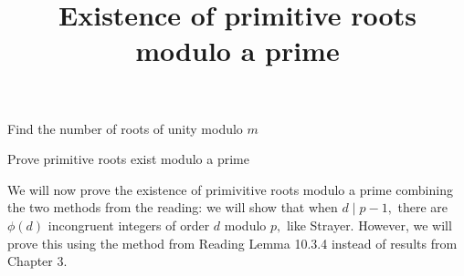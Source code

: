 \documentclass{ximera}
\title{Existence of primitive roots modulo a prime}
\begin{document}
\begin{abstract}
\end{abstract}
\maketitle


\begin{obj}
    \item Find the number of roots of unity modulo $m$
    \item Prove primitive roots exist modulo a prime
\end{obj}

We will now prove the existence of primivitive roots modulo a prime combining the two methods from the reading: we will show that when $d\mid p-1,$ there are $\phi(d)$ incongruent integers of order $d$ modulo $p,$ like Strayer. However, we will prove this using the method from Reading Lemma 10.3.4 instead of results from Chapter 3.
\end{document}
